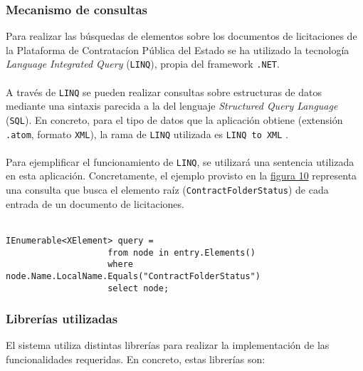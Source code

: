         \subsubsection{Mecanismo de consultas}
            Para realizar las búsquedas de elementos sobre los documentos de licitaciones de la Plataforma de Contratacíon Pública del Estado se ha utilizado la tecnología \textit{Language Integrated Query} (\texttt{LINQ}), propia del framework \texttt{.NET}.
            \\ \\
            A través de \texttt{LINQ} se pueden realizar consultas sobre estructuras de datos mediante una sintaxis parecida a la del lenguaje \textit{Structured Query Language} (\texttt{SQL}). En concreto, para el tipo de datos que la aplicación obtiene (extensión \texttt{.atom}, formato \texttt{XML}), la rama de \texttt{LINQ} utilizada es \texttt{LINQ to XML} \cite{LINQXML}.
            \\ \\
            Para ejemplificar el funcionamiento de \texttt{LINQ}, se utilizará una sentencia utilizada en esta aplicación. Concretamente, el ejemplo provisto en la \hyperref[fig:linq]{figura 10} representa una consulta que busca el elemento raíz (\texttt{ContractFolderStatus}) de cada entrada de un documento de licitaciones.
            \\ \\
            \begin{lstlisting}[language=lCSharp,gobble=14]
                IEnumerable<XElement> query =
                    from node in entry.Elements()
                    where node.Name.LocalName.Equals("ContractFolderStatus")
                    select node;
            \end{lstlisting}
            \label{fig:linq}
        
        \subsubsection{Librerías utilizadas}
            El sistema utiliza distintas librerías para realizar la implementación de las funcionalidades requeridas. En concreto, estas librerías son:
            

